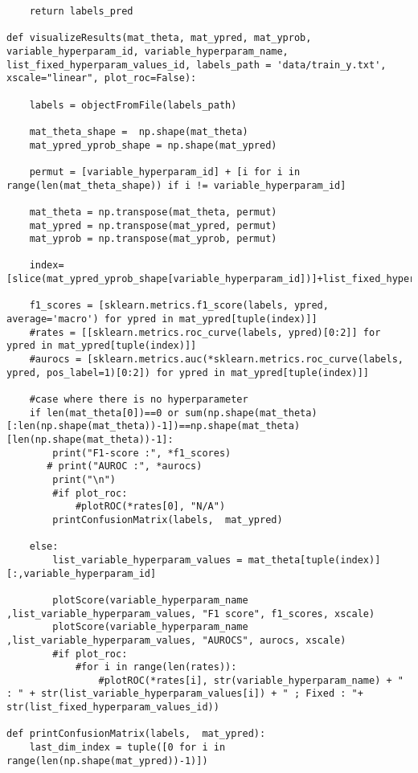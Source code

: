 \documentclass{article}
\begin{document}
\begin{lstlisting}
    return labels_pred

def visualizeResults(mat_theta, mat_ypred, mat_yprob,  variable_hyperparam_id, variable_hyperparam_name, list_fixed_hyperparam_values_id, labels_path = 'data/train_y.txt', xscale="linear", plot_roc=False):
    
    labels = objectFromFile(labels_path)
    
    mat_theta_shape =  np.shape(mat_theta)
    mat_ypred_yprob_shape = np.shape(mat_ypred)

    permut = [variable_hyperparam_id] + [i for i in range(len(mat_theta_shape)) if i != variable_hyperparam_id]
    
    mat_theta = np.transpose(mat_theta, permut)
    mat_ypred = np.transpose(mat_ypred, permut)
    mat_yprob = np.transpose(mat_yprob, permut)

    index=[slice(mat_ypred_yprob_shape[variable_hyperparam_id])]+list_fixed_hyperparam_values_id
    
    f1_scores = [sklearn.metrics.f1_score(labels, ypred, average='macro') for ypred in mat_ypred[tuple(index)]]
    #rates = [[sklearn.metrics.roc_curve(labels, ypred)[0:2]] for ypred in mat_ypred[tuple(index)]]
    #aurocs = [sklearn.metrics.auc(*sklearn.metrics.roc_curve(labels, ypred, pos_label=1)[0:2]) for ypred in mat_ypred[tuple(index)]]

    #case where there is no hyperparameter
    if len(mat_theta[0])==0 or sum(np.shape(mat_theta)[:len(np.shape(mat_theta))-1])==np.shape(mat_theta)[len(np.shape(mat_theta))-1]:
        print("F1-score :", *f1_scores)
       # print("AUROC :", *aurocs)
        print("\n")
        #if plot_roc:
            #plotROC(*rates[0], "N/A")
        printConfusionMatrix(labels,  mat_ypred)
        
    else:
        list_variable_hyperparam_values = mat_theta[tuple(index)][:,variable_hyperparam_id]
        
        plotScore(variable_hyperparam_name ,list_variable_hyperparam_values, "F1 score", f1_scores, xscale)
        plotScore(variable_hyperparam_name ,list_variable_hyperparam_values, "AUROCS", aurocs, xscale)
        #if plot_roc:
            #for i in range(len(rates)):
                #plotROC(*rates[i], str(variable_hyperparam_name) + " : " + str(list_variable_hyperparam_values[i]) + " ; Fixed : "+ str(list_fixed_hyperparam_values_id))

def printConfusionMatrix(labels,  mat_ypred):
    last_dim_index = tuple([0 for i in range(len(np.shape(mat_ypred))-1)])
    

\end{lstlisting}
\end{document}
